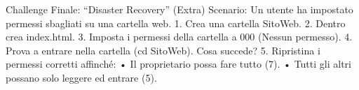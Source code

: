 \documentclass[11pt,a4paper]{article}
\begin{document}
Challenge Finale: ``Disaster Recovery'' (Extra) Scenario: Un utente ha
impostato permessi sbagliati su una cartella web. 1. Crea una cartella
SitoWeb. 2. Dentro crea index.html. 3. Imposta i permessi della cartella
a 000 (Nessun permesso). 4. Prova a entrare nella cartella (cd SitoWeb).
Cosa succede? 5. Ripristina i permessi corretti affinché: • Il
proprietario possa fare tutto (7). • Tutti gli altri possano solo
leggere ed entrare (5).


\end{document}

